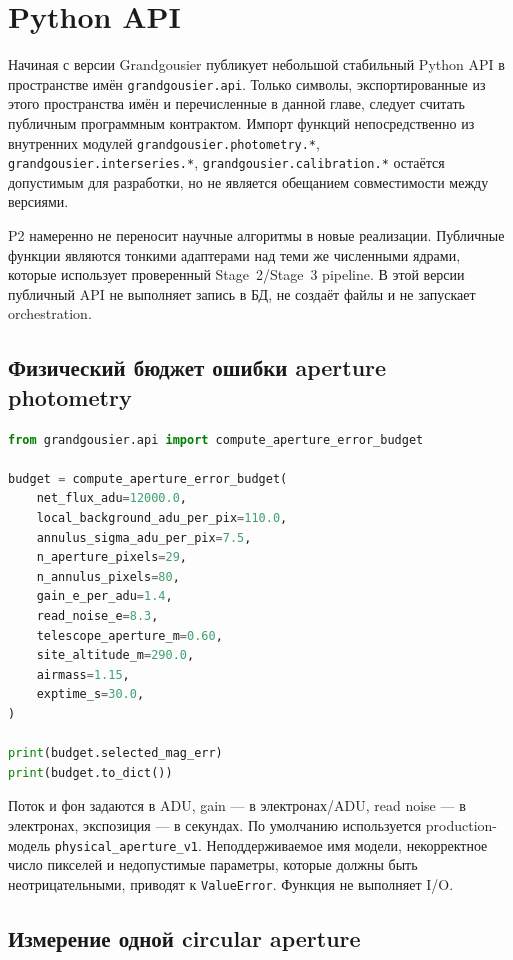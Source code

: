 \chapter{Python API}

Начиная с версии \manualversion{} Grandgousier публикует небольшой стабильный Python API в пространстве имён \texttt{grandgousier.api}. Только символы, экспортированные из этого пространства имён и перечисленные в данной главе, следует считать публичным программным контрактом. Импорт функций непосредственно из внутренних модулей \texttt{grandgousier.photometry.*}, \texttt{grandgousier.interseries.*}, \texttt{grandgousier.calibration.*} остаётся допустимым для разработки, но не является обещанием совместимости между версиями.

P2 намеренно не переносит научные алгоритмы в новые реализации. Публичные функции являются тонкими адаптерами над теми же численными ядрами, которые использует проверенный Stage~2/Stage~3 pipeline. В этой версии публичный API не выполняет запись в БД, не создаёт файлы и не запускает orchestration.

\section{Физический бюджет ошибки aperture photometry}

\begin{lstlisting}[language=Python]
from grandgousier.api import compute_aperture_error_budget

budget = compute_aperture_error_budget(
    net_flux_adu=12000.0,
    local_background_adu_per_pix=110.0,
    annulus_sigma_adu_per_pix=7.5,
    n_aperture_pixels=29,
    n_annulus_pixels=80,
    gain_e_per_adu=1.4,
    read_noise_e=8.3,
    telescope_aperture_m=0.60,
    site_altitude_m=290.0,
    airmass=1.15,
    exptime_s=30.0,
)

print(budget.selected_mag_err)
print(budget.to_dict())
\end{lstlisting}

Поток и фон задаются в ADU, gain --- в электронах/ADU, read noise --- в электронах, экспозиция --- в секундах. По умолчанию используется production-модель \texttt{physical\_aperture\_v1}. Неподдерживаемое имя модели, некорректное число пикселей и недопустимые параметры, которые должны быть неотрицательными, приводят к \texttt{ValueError}. Функция не выполняет I/O.

\section{Измерение одной circular aperture}

